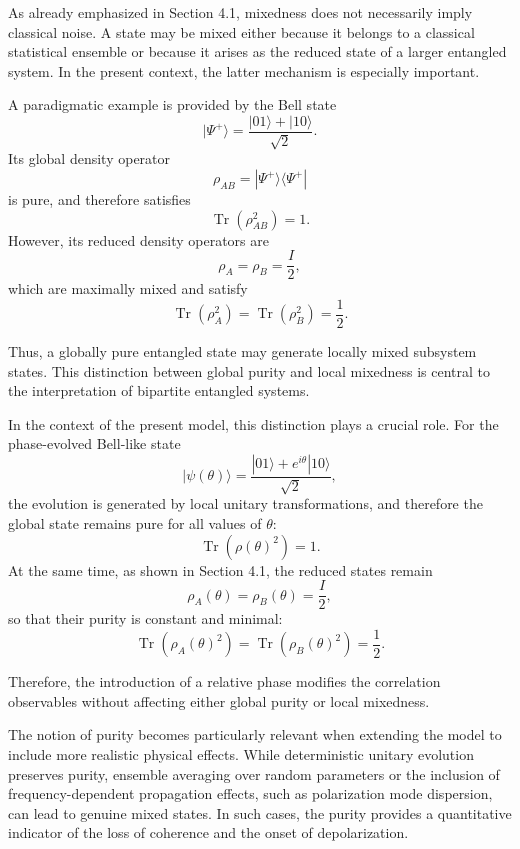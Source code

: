 \documentclass[a4paper]{article}
\begin{document}
\medskip

As already emphasized in Section 4.1, mixedness does not necessarily imply classical noise. A state may be mixed either because it belongs to a classical statistical ensemble or because it arises as the reduced state of a larger entangled system. In the present context, the latter mechanism is especially important.

A paradigmatic example is provided by the Bell state
\[
|\Psi^+\rangle = \frac{|01\rangle + |10\rangle}{\sqrt{2}}.
\]
Its global density operator
\[
\rho_{AB} = |\Psi^+\rangle \langle \Psi^+|
\]
is pure, and therefore satisfies
\[
\operatorname{Tr}(\rho_{AB}^2) = 1.
\]
However, its reduced density operators are
\[
\rho_A = \rho_B = \frac{I}{2},
\]
which are maximally mixed and satisfy
\[
\operatorname{Tr}(\rho_A^2) = \operatorname{Tr}(\rho_B^2) = \frac{1}{2}.
\]

Thus, a globally pure entangled state may generate locally mixed subsystem states. This distinction between global purity and local mixedness is central to the interpretation of bipartite entangled systems.

\medskip

In the context of the present model, this distinction plays a crucial role. For the phase-evolved Bell-like state
\[
|\psi(\theta)\rangle = \frac{|01\rangle + e^{i\theta}|10\rangle}{\sqrt{2}},
\]
the evolution is generated by local unitary transformations, and therefore the global state remains pure for all values of $\theta$:
\[
\operatorname{Tr}(\rho(\theta)^2) = 1.
\]
At the same time, as shown in Section 4.1, the reduced states remain
\[
\rho_A(\theta) = \rho_B(\theta) = \frac{I}{2},
\]
so that their purity is constant and minimal:
\[
\operatorname{Tr}(\rho_A(\theta)^2) = \operatorname{Tr}(\rho_B(\theta)^2) = \frac{1}{2}.
\]

Therefore, the introduction of a relative phase modifies the correlation observables without affecting either global purity or local mixedness.

\medskip

The notion of purity becomes particularly relevant when extending the model to include more realistic physical effects. While deterministic unitary evolution preserves purity, ensemble averaging over random parameters or the inclusion of frequency-dependent propagation effects, such as polarization mode dispersion, can lead to genuine mixed states. In such cases, the purity provides a quantitative indicator of the loss of coherence and the onset of depolarization.
\end{document}
